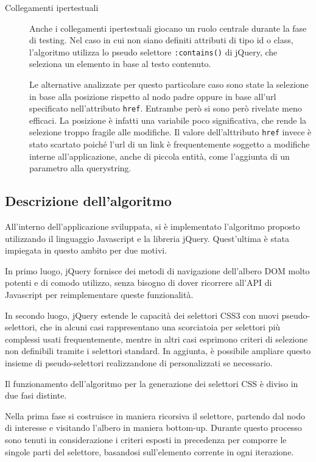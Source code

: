 \begin{description}
\item[Collegamenti ipertestuali] Anche i collegamenti ipertestuali giocano un ruolo centrale durante la fase di testing. Nel caso in cui non siano definiti attributi di tipo id o class, l'algoritmo utilizza lo pseudo selettore \verb|:contains()| di jQuery, che seleziona un elemento in base al testo contenuto.

Le alternative analizzate per questo particolare caso sono state la selezione in base alla posizione rispetto al nodo padre oppure in base all'url specificato nell'attributo \verb|href|. Entrambe però si sono però rivelate meno efficaci. La posizione è infatti una variabile poco significativa, che rende la selezione troppo fragile alle modifiche. Il valore dell'alttributo \verb|href| invece è stato scartato poiché l'url di un link è frequentemente soggetto a modifiche interne all'applicazione, anche di piccola entità, come l'aggiunta di un parametro alla querystring.

\end{description}

\subsection {Descrizione dell'algoritmo}

All'interno dell'applicazione sviluppata, si è implementato l'algoritmo proposto utilizzando il linguaggio Javascript e la libreria jQuery. Quest'ultima è stata impiegata in questo ambito per due motivi. 

In primo luogo, jQuery fornisce dei metodi di navigazione dell'albero DOM molto potenti e di comodo utilizzo, senza bisogno di dover ricorrere all'API di Javascript per reimplementare queste funzionalità. 

In secondo luogo, jQuery estende le capacità dei selettori CSS3 con nuovi pseudo-selettori, che in alcuni casi rappresentano una scorciatoia per selettori più complessi usati frequentemente, mentre in altri casi esprimono criteri di selezione non definibili tramite i selettori standard. In aggiunta, è possibile ampliare questo insieme di pseudo-selettori realizzandone di personalizzati se necessario.

Il funzionamento dell'algoritmo per la generazione dei selettori CSS è diviso in due fasi distinte. 

Nella prima fase si costruisce in maniera ricorsiva il selettore, partendo dal nodo di interesse e visitando l'albero in maniera bottom-up. Durante questo processo sono tenuti in considerazione i criteri esposti in precedenza per comporre le singole parti del selettore, basandosi sull'elemento corrente in ogni iterazione.

